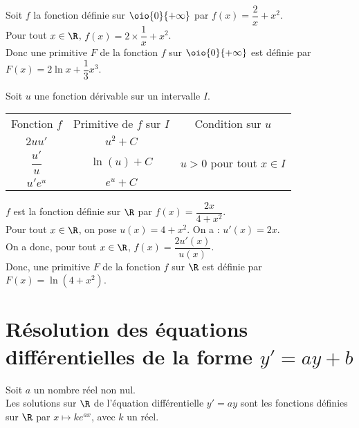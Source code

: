\documentclass[a4paper,11pt,cours]{nsi} %
\begin{document}
\begin{exemple}[]
    Soit $f$ la fonction définie sur $\oio{0}{+\infty}$ par $f(x)=\dfrac{2}{x}+x^2$.\\
    Pour tout $x\in\R$, $f(x)=2\times \dfrac{1}{x}+x^2$.\\
    Donc une primitive $F$ de la fonction $f$ sur $\oio{0}{+\infty}$ est définie par $F(x)= 2\ln x+\dfrac{1}{3}x^3$.
\end{exemple}
\begin{propriete}
    Soit $u$ une fonction dérivable sur un intervalle $I$.\\[.5em]
    \renewcommand{\arraystretch}{2}
    \tabstyle[UGLiRed]
	\begin{tabular}{|c|c|c|}
		\hline
		\ccell Fonction $f$  & \ccell Primitive de $f$ sur $I$ & \ccell Condition sur $u$\\
        $2uu'$ & $u^2+C$ & \\
		\hline
		$\dfrac{u'}{u}$ & $\ln(u) + C$ & $u>0$ pour tout $x\in I$ \\
		\hline
        $u'e^u$ & $e^u+C$ &  \\
        \hline
	\end{tabular}
\end{propriete}
\begin{exemple}[]
    $f$ est la fonction définie sur $\R$ par $f(x)=\dfrac{2x}{4+x^2}$.\\[.5em]
    Pour tout $x\in\R$, on pose $u(x)=4+x^2$. On a : $u'(x)=2x$.\\[.5em]
    On a donc, pour tout $x\in\R$, $f(x)=\dfrac{2u'(x)}{u(x)}$.\\[.5em]
    Donc, une primitive $F$ de la fonction $f$ sur $\R$ est définie par $F(x)=\ln(4+x^2)$.
\end{exemple}

\section{Résolution des équations différentielles de la forme $y'=ay+b$}
\begin{propriete}[ : Équations différentielles de la forme $y'=ay$]
    Soit $a$ un nombre réel non nul.\\
    Les solutions sur $\R$ de l'équation différentielle $y'=ay$ sont les fonctions définies sur $\R$ par $x\mapsto ke^{ax}$, avec $k$ un réel.
\end{propriete}
\end{document}
